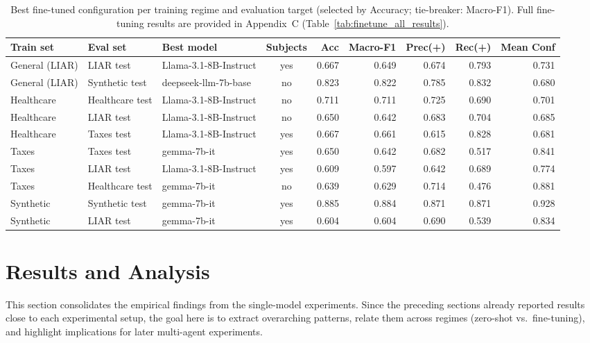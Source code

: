 \begin{table}[!htbp]
\centering
\scriptsize
\setlength{\tabcolsep}{3.5pt}
\renewcommand{\arraystretch}{1.08}
\caption{Best fine-tuned configuration per training regime and evaluation target (selected by Accuracy; tie-breaker: Macro-F1). Full fine-tuning results are provided in Appendix~C (Table~\ref{tab:finetune_all_results}).}
\label{tab:finetune_bestof}
\begin{tabular}{l l l c r r r r r}
\toprule
Train set & Eval set & Best model & Subjects & Acc & Macro-F1 & Prec(+) & Rec(+) & Mean Conf \\
\midrule
General (LIAR) & LIAR test      & Llama-3.1-8B-Instruct & yes & 0.667 & 0.649 & 0.674 & 0.793 & 0.731 \\
General (LIAR) & Synthetic test & deepseek-llm-7b-base  &  no & 0.823 & 0.822 & 0.785 & 0.832 & 0.680 \\
\addlinespace
Healthcare     & Healthcare test & Llama-3.1-8B-Instruct &  no & 0.711 & 0.711 & 0.725 & 0.690 & 0.701 \\
Healthcare     & LIAR test       & Llama-3.1-8B-Instruct &  no & 0.650 & 0.642 & 0.683 & 0.704 & 0.685 \\
Healthcare     & Taxes test      & Llama-3.1-8B-Instruct & yes & 0.667 & 0.661 & 0.615 & 0.828 & 0.681 \\
\addlinespace
Taxes          & Taxes test      & gemma-7b-it           & yes & 0.650 & 0.642 & 0.682 & 0.517 & 0.841 \\
Taxes          & LIAR test       & Llama-3.1-8B-Instruct & yes & 0.609 & 0.597 & 0.642 & 0.689 & 0.774 \\
Taxes          & Healthcare test & gemma-7b-it           &  no & 0.639 & 0.629 & 0.714 & 0.476 & 0.881 \\
\addlinespace
Synthetic      & Synthetic test  & gemma-7b-it           & yes & 0.885 & 0.884 & 0.871 & 0.871 & 0.928 \\
Synthetic      & LIAR test       & gemma-7b-it           & yes & 0.604 & 0.604 & 0.690 & 0.539 & 0.834 \\
\bottomrule
\end{tabular}
\end{table}

\section{Results and Analysis}

This section consolidates the empirical findings from the single-model experiments. Since the preceding sections already reported results close to each experimental setup, the goal here is to extract overarching patterns, relate them across regimes (zero-shot vs.\ fine-tuning), and highlight implications for later multi-agent experiments.

